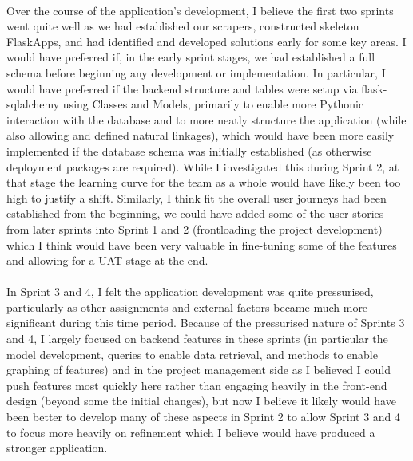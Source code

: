 \documentclass{scrreprt}
\begin{document}
\\
Over the course of the application's development, I believe the first two sprints went quite well as we had established our scrapers, constructed skeleton FlaskApps, and had identified and developed solutions early for some key areas. I would have preferred if, in the early sprint stages, we had established a full schema before beginning any development or implementation. In particular, I would have preferred if the backend structure and tables were setup via flask-sqlalchemy using Classes and Models, primarily to enable more Pythonic interaction with the database and to more neatly structure the application (while also allowing and defined natural linkages), which would have been more easily implemented if the database schema was initially established (as otherwise deployment packages are required). While I investigated this during Sprint 2, at that stage the learning curve for the team as a whole would have likely been too high to justify a shift. Similarly, I think fit the overall user journeys had been established from the beginning, we could have added some of the user stories from later sprints into Sprint 1 and 2 (frontloading the project development) which I think would have been very valuable in fine-tuning some of the features and allowing for a UAT stage at the end.\\
\\
In Sprint 3 and 4, I felt the application development was quite pressurised, particularly as other assignments and external factors became much more significant during this time period. Because of the pressurised nature of Sprints 3 and 4, I largely focused on backend features in these sprints (in particular the model development, queries to enable data retrieval, and methods to enable graphing of features) and in the project management side as I believed I could push features most quickly here rather than engaging heavily in the front-end design (beyond some the initial changes), but now I believe it likely would have been better to develop many of these aspects in Sprint 2 to allow Sprint 3 and 4 to focus more heavily on refinement which I believe would have produced a stronger application.\\
\\
\end{document}

